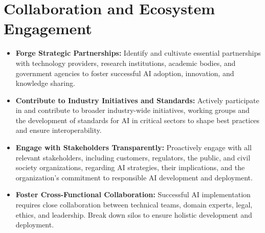 \section*{Collaboration and Ecosystem Engagement}
\begin{itemize}
    \item \textbf{Forge Strategic Partnerships:} Identify and cultivate essential partnerships with technology providers, research institutions, academic bodies, and government agencies to foster successful AI adoption, innovation, and knowledge sharing.
    \item \textbf{Contribute to Industry Initiatives and Standards:} Actively participate in and contribute to broader industry-wide initiatives, working groups and the development of standards for AI in critical sectors to shape best practices and ensure interoperability.
    \item \textbf{Engage with Stakeholders Transparently:} Proactively engage with all relevant stakeholders, including customers, regulators, the public, and civil society organizations, regarding AI strategies, their implications, and the organization's commitment to responsible AI development and deployment.
    \item \textbf{Foster Cross-Functional Collaboration:} Successful AI implementation requires close collaboration between technical teams, domain experts, legal, ethics, and leadership. Break down silos to ensure holistic development and deployment.
\end{itemize}
